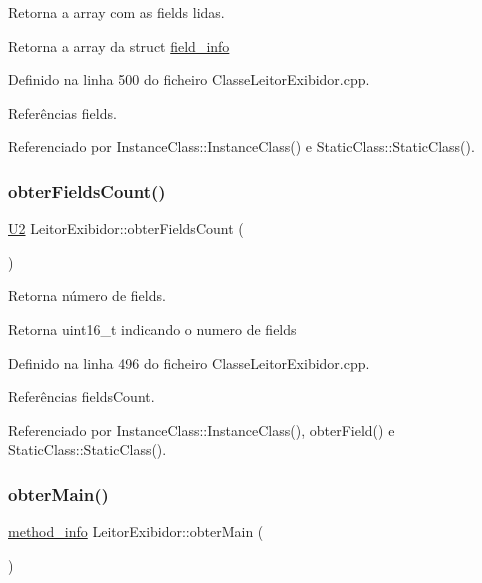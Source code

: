 Retorna a array com as fields lidas. 

\begin{DoxyReturn}{Retorna}
a array da struct \hyperlink{structfield__info}{field\+\_\+info} 
\end{DoxyReturn}


Definido na linha 500 do ficheiro Classe\+Leitor\+Exibidor.\+cpp.



Referências fields.



Referenciado por Instance\+Class\+::\+Instance\+Class() e Static\+Class\+::\+Static\+Class().

\mbox{\label{classLeitorExibidor_a483e90f3d60c63a2b3d1106961c7f553}} 
\subsubsection{\texorpdfstring{obter\+Fields\+Count()}{obterFieldsCount()}}
{\footnotesize\ttfamily \hyperlink{BasicTypes_8h_a90240657108b1b457eef9d3f76e0202e}{U2} Leitor\+Exibidor\+::obter\+Fields\+Count (\begin{DoxyParamCaption}{ }\end{DoxyParamCaption})}



Retorna número de fields. 

\begin{DoxyReturn}{Retorna}
uint16\+\_\+t indicando o numero de fields 
\end{DoxyReturn}


Definido na linha 496 do ficheiro Classe\+Leitor\+Exibidor.\+cpp.



Referências fields\+Count.



Referenciado por Instance\+Class\+::\+Instance\+Class(), obter\+Field() e Static\+Class\+::\+Static\+Class().

\mbox{\label{classLeitorExibidor_a161f1cc97c2c71c800cf588f8a4eab67}} 
\subsubsection{\texorpdfstring{obter\+Main()}{obterMain()}}
{\footnotesize\ttfamily \hyperlink{structmethod__info}{method\+\_\+info} Leitor\+Exibidor\+::obter\+Main (\begin{DoxyParamCaption}{ }\end{DoxyParamCaption})}



